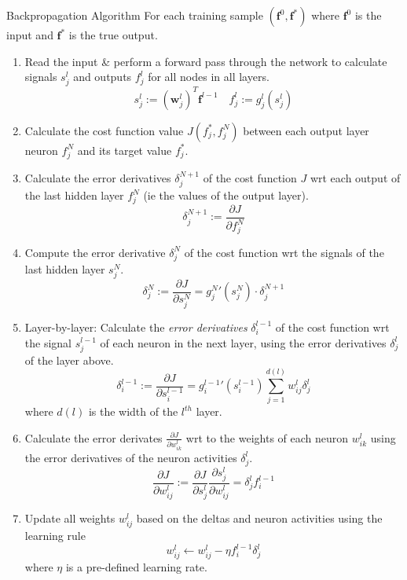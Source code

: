 \documentclass[11pt,a4paper]{article}
\begin{document}
  \begin{proposition}{Backpropagation Algorithm}
    For each training sample $(\mathbf{f}^0,\mathbf{f}^*)$ where $\mathbf{f}^0$ is the input and $\mathbf{f}^*$ is the true output.
    \begin{enumerate}
      \item Read the input \& perform a forward pass through the network to calculate signals $s_j^l$ and outputs $f_j^l$ for all nodes in all layers.
      \[  s_j^l:=(\mathbf{w}_j^l)^T\mathbf{f}^{l-1}\quad f_j^l:=g_j^l(s_j^l) \]

      \item Calculate the cost function value $J(f_j^*,f_j^N)$ between each output layer neuron $f_j^N$ and its target value $f_j^*$.

      \item Calculate the error derivatives $\delta_j^{N+1}$ of the cost function $J$ wrt each output of the last hidden layer $f_j^N$ (ie the values of the output layer).
      \[ \delta_j^{N+1}:=\frac{\partial J}{\partial f_j^N} \]

      \item Compute the error derivative $\delta_j^N$ of the cost function wrt the signals of the last hidden layer $s_j^N$.
      \[ \delta_j^N:=\frac{\partial J}{\partial s_j^N}=g_j^N'(s_j^N)\cdot\delta_j^{N+1} \]

      \item Layer-by-layer: Calculate the \textit{error derivatives} $\delta_i^{l-1}$ of the cost function wrt the signal $s_j^{l-1}$  of each neuron in the next layer, using the error derivatives $\delta_j^l$ of the layer above.
      \[ \delta_i^{l-1}:=\frac{\partial J}{\partial s_i^{l-1}}=g_i^{l-1}'(s_i^{l-1})\sum_{j=1}^{d(l)}w_{ij}^l\delta_j^l \]
      where $d(l)$ is the width of the $l^{th}$ layer.

      \item Calculate the error derivates $\frac{\partial J}{\partial w_{ik}^l}$ wrt to the weights of each neuron $w_{ik}^l$ using the error derivatives of the neuron activities $\delta_j^l$.
      \[ \frac{\partial J}{\partial w_{ij}^l}:=\frac{\partial J}{\partial s_j^l}\frac{\partial s_j^l}{\partial w_{ij}^l}=\delta_j^lf_i^{l-1} \]

      \item Update all weights $w_{ij}^l$ based on the deltas and neuron activities using the  learning rule
      \[ w_{ij}^l\leftarrow w_{ij}^l-\eta f_i^{l-1}\delta_j^l\]
      where $\eta$ is a pre-defined learning rate.
    \end{enumerate}
  \end{proposition}
\end{document}
